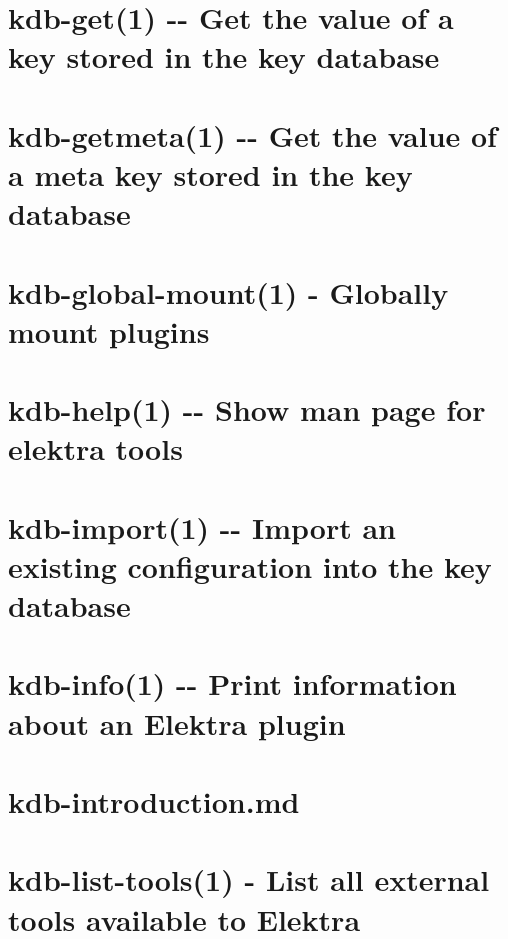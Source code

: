 \documentclass[twoside]{book}
\newcommand{\+}{\discretionary{\mbox{\scriptsize$\hookleftarrow$}}{}{}}
\begin{document}
\chapter{kdb-\/get(1) -\/-\/ Get the value of a key stored in the key database}
\label{md_doc_help_kdb-get}
\hypertarget{md_doc_help_kdb-get}{}

\chapter{kdb-\/getmeta(1) -\/-\/ Get the value of a meta key stored in the key database}
\label{md_doc_help_kdb-getmeta}
\hypertarget{md_doc_help_kdb-getmeta}{}

\chapter{kdb-\/global-\/mount(1) -\/ Globally mount plugins}
\label{md_doc_help_kdb-global-mount}
\hypertarget{md_doc_help_kdb-global-mount}{}

\chapter{kdb-\/help(1) -\/-\/ Show man page for elektra tools}
\label{md_doc_help_kdb-help}
\hypertarget{md_doc_help_kdb-help}{}

\chapter{kdb-\/import(1) -\/-\/ Import an existing configuration into the key database}
\label{md_doc_help_kdb-import}
\hypertarget{md_doc_help_kdb-import}{}

\chapter{kdb-\/info(1) -\/-\/ Print information about an Elektra plugin}
\label{md_doc_help_kdb-info}
\hypertarget{md_doc_help_kdb-info}{}

\chapter{kdb-\/introduction.md}
\label{doc_help_kdb-introduction_md}
\hypertarget{doc_help_kdb-introduction_md}{}

\chapter{kdb-\/list-\/tools(1) -\/ List all external tools available to Elektra}
\label{md_doc_help_kdb-list-tools}
\hypertarget{md_doc_help_kdb-list-tools}{}

\end{document}
